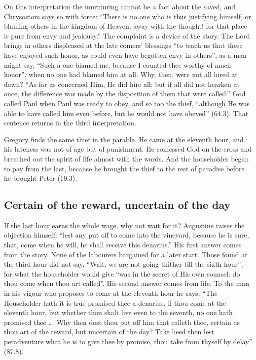 On this interpretation the murmuring cannot be a fact about the saved, and Chrysostom
says so with force: ``There is no one who is thus justifying himself, or
blaming others in the kingdom of Heaven; away with the thought! for that place
is pure from envy and jealousy.'' The complaint is a device of the story. The
Lord brings in others displeased at the late comers' blessings ``to teach us
that these have enjoyed such honor, as could even have begotten envy in
others'', as a man might say, ``Such a one blamed me, because I counted thee
worthy of much honor'', when no one had blamed him at all. Why, then, were not
all hired at dawn? ``As far as concerned Him, He did hire all; but if all did
not hearken at once, the difference was made by the disposition of them that
were called.'' God called Paul when Paul was ready to obey, and so too the
thief, ``although He was able to have called him even before, but he would
not have obeyed'' (64.3). That sentence returns in the third interpretation.

Gregory finds the same thief in the parable. He came at the eleventh hour,
and : his
lateness was not of age but of punishment. He confessed God on the cross and
breathed out the spirit of life almost with the words. And the householder began to pay from
the last, because he brought the thief to the rest of paradise before he
brought Peter (19.3).

\subsection{Certain of the reward, uncertain of the day}

If the last hour earns the whole wage, why not wait for it? Augustine raises
the objection himself: ``lest any put off to come into the vineyard, because
he is sure, that, come when he will, he shall receive this denarius.'' His
first answer comes from the story. None of the labourers bargained for a later
start. Those found at the third hour did not say, ``Wait, we are not going
thither till the sixth hour'', for what the householder would give ``was in
the secret of His own counsel: do thou come when thou art called''. His second
answer comes from life. To the man in his vigour who proposes to come at the
eleventh hour he says: ``The Householder hath it is true promised thee a
denarius, if thou come at the eleventh hour, but whether thou shalt live even
to the seventh, no one hath promised thee \ldots\ Why then dost thou put off
him that calleth thee, certain as thou art of the reward, but uncertain of the
day? Take heed then lest peradventure what he is to give thee by promise, thou
take from thyself by delay'' (87.8).

